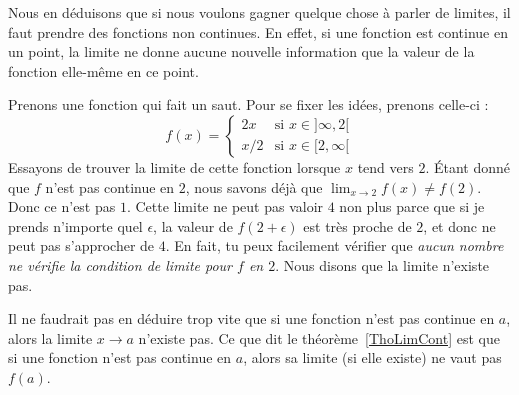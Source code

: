 Nous en déduisons que si nous voulons gagner quelque chose à parler de limites, il faut prendre des fonctions non continues. En effet, si une fonction est continue en un point, la limite ne donne aucune nouvelle information que la valeur de la fonction elle-même en ce point.

Prenons une fonction qui fait un saut. Pour se fixer les idées, prenons celle-ci :
\begin{equation}    \label{EqnCtOEL}
f(x)=
\begin{cases}
2x&\text{si }x\in]\infty,2[\\
x/2&\text{si }x\in[2,\infty[
\end{cases}
\end{equation}
Essayons de trouver la limite de cette fonction lorsque $x$ tend vers $2$. Étant donné que $f$ n'est pas continue en $2$, nous savons déjà que $\lim_{x\to 2}f(x)\neq f(2)$. Donc ce n'est pas $1$. Cette limite ne peut pas valoir $4$ non plus parce que si je prends n'importe quel $\epsilon$, la valeur de $f(2+\epsilon)$ est très proche de $2$, et donc ne peut pas s'approcher de $4$. En fait, tu peux facilement vérifier que \emph{aucun nombre ne vérifie la condition de limite pour $f$ en $2$}. Nous disons que la limite n'existe pas.

Il ne faudrait pas en déduire trop vite que si une fonction n'est pas continue en \( a\), alors la limite \( x\to a\) n'existe pas. Ce que dit le théorème~\ref{ThoLimCont} est que si une fonction n'est pas continue en \( a\), alors sa limite (si elle existe) ne vaut pas \( f(a)\).

